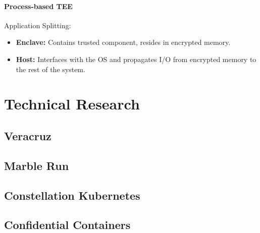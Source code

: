 \subsubsection{Process-based TEE}

Application Splitting:

\begin{itemize}
  \item \textbf{Enclave:} Contains trusted component, resides in encrypted
        memory.
  \item \textbf{Host:} Interfaces with the OS and propagates I/O from encrypted
        memory to the rest of the system.
\end{itemize}


\chapter{Technical Research}

\section{Veracruz}

\section{Marble Run}

\section{Constellation Kubernetes}

\section{Confidential Containers}

